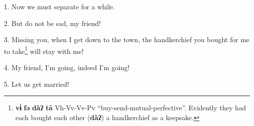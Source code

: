 \setcounter{footnote}{0}

1. Now we must separate for a while.

2. But do not be sad, my friend!

3. Missing you, when I get down to the town, the handkerchief you bought for me
to take\footnote{\textbf{vɨ̀} \textbf{fə} \textbf{dàʔ} \textbf{tā} Vh-Vv-Vv-Pv ``buy-send-mutual-perfective''. Evidently they had each bought each other (\textbf{dàʔ}) a handkerchief as a keepsake.} will stay with me!

4. My friend, I'm going, indeed I'm going!

5. Let us get married!

